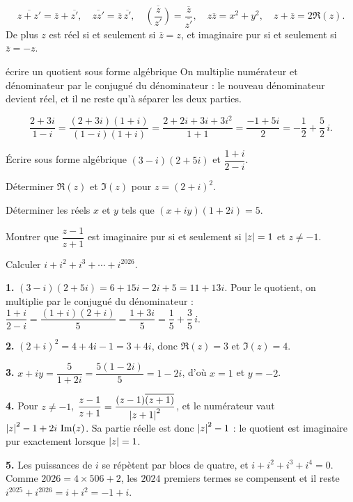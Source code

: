 \begin{propriete}
\[
  \overline{z+z'} = \overline z+\overline{z'}, \quad
  \overline{zz'} = \overline z\,\overline{z'}, \quad
  \overline{\left(\frac{z}{z'}\right)} = \frac{\overline z}{\overline{z'}},
  \quad z\overline z = x^{2}+y^{2}, \quad
  z+\overline z = 2\Re(z).
\]
De plus $z$ est réel si et seulement si $\overline z = z$, et imaginaire pur
si et seulement si $\overline z = -z$.
\end{propriete}

\begin{methode}{écrire un quotient sous forme algébrique}
On multiplie numérateur et dénominateur par le conjugué du dénominateur : le
nouveau dénominateur devient réel, et il ne reste qu'à séparer les deux
parties.
\end{methode}

\begin{exemple}[un quotient]
\[
  \frac{2+3i}{1-i}
  = \frac{(2+3i)(1+i)}{(1-i)(1+i)}
  = \frac{2+2i+3i+3i^{2}}{1+1}
  = \frac{-1+5i}{2}
  = -\frac12+\frac52\,i .
\]
\end{exemple}

\begin{entrainement}
\exo[\niveau{1}] Écrire sous forme algébrique $(3-i)(2+5i)$ et
$\dfrac{1+i}{2-i}$.

\exo[\niveau{1}] Déterminer $\Re(z)$ et $\Im(z)$ pour $z = (2+i)^{2}$.

\exo[\niveau{2}] Déterminer les réels $x$ et $y$ tels que
$(x+iy)(1+2i) = 5$.

\exo[\niveau{2}] Montrer que $\dfrac{z-1}{z+1}$ est imaginaire pur si et
seulement si $\left|z\right| = 1$ et $z \neq -1$.

\exo[\niveau{3}] Calculer $i+i^{2}+i^{3}+\cdots+i^{2026}$.
\end{entrainement}

\begin{corrige}
\textbf{1.} $(3-i)(2+5i) = 6+15i-2i+5 = 11+13i$. Pour le quotient, on
multiplie par le conjugué du dénominateur :
$\dfrac{1+i}{2-i} = \dfrac{(1+i)(2+i)}{5} = \dfrac{1+3i}{5}
= \dfrac15+\dfrac35\,i$.

\textbf{2.} $(2+i)^{2} = 4+4i-1 = 3+4i$, donc $\Re(z) = 3$ et $\Im(z) = 4$.

\textbf{3.} $x+iy = \dfrac{5}{1+2i} = \dfrac{5(1-2i)}{5} = 1-2i$, d'où
$x = 1$ et $y = -2$.

\textbf{4.} Pour $z \neq -1$,
$\dfrac{z-1}{z+1} = \dfrac{(z-1)\overline{(z+1)}}{\left|z+1\right|^{2}}$, et le
numérateur vaut $\left|z\right|^{2}-1+2i\,\operatorname{Im}(z)$. Sa partie réelle est donc
$\left|z\right|^{2}-1$ : le quotient est imaginaire pur exactement lorsque
$\left|z\right| = 1$.

\textbf{5.} Les puissances de $i$ se répètent par blocs de quatre, et
$i+i^{2}+i^{3}+i^{4} = 0$. Comme $2026 = 4\times506+2$, les $2024$ premiers
termes se compensent et il reste
$i^{2025}+i^{2026} = i+i^{2} = -1+i$.
\end{corrige}

